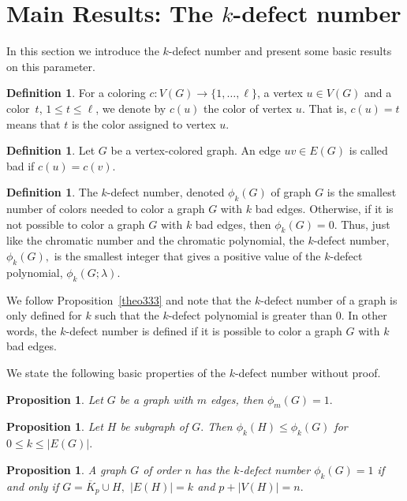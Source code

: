 \documentclass[12pt]{amsart}
\newtheorem{proposition}[theorem]{Proposition}
\theoremstyle{definition}
\newtheorem{definition}[theorem]{Definition}
\theoremstyle{remark}
\numberwithin{equation}{section}
\begin{document}
\section{Main Results: The $k$-defect number}\label{PrelResults}
In this section we introduce the $k$-defect number and present some basic results on this parameter.
\begin{definition}
For a coloring $c:V(G)\rightarrow \{1,\ldots,\ell\}$, a vertex $u \in V(G)$ and a color~$t$, $1\leq
t\leq \ell$, we denote by $c(u)$ the color of vertex $u$. That is, $c(u) = t$ means that $t$ is the color assigned to vertex $u$.
\end{definition}

\begin{definition}
Let $G$ be a  vertex-colored graph. An edge $uv \in E(G)$ is called bad if $c(u) = c(v)$.  
\end{definition}

\begin{definition}
The $k$-defect number, denoted $\phi_k(G)$ of graph $G$ is the smallest number of colors needed to color a graph $G$ with $k$ bad edges. Otherwise, if it is not possible  to color a graph $G$  with $k$ bad edges, then $\phi_k(G)=0.$  Thus, just like the chromatic number and the chromatic polynomial, the $k$-defect number, $\phi_k(G),$ is the smallest integer that gives  a positive value of  the $k$-defect polynomial, $\phi_{k}(G;\lambda).$ 
\end{definition}

We follow Proposition~\ref{theo333}  and  note that the $k$-defect number of a graph  is only defined  for $k$  such that  the $k$-defect polynomial is  greater than 0. In other words, the $k$-defect number is defined if it is possible to color a graph $G$  with $k$ bad edges.


 We state the following  basic properties of the $k$-defect number without proof.
\begin{proposition} Let $G$ be a graph with $m$ edges, then $\phi_m(G)=1.$ 
\end{proposition}
\begin{proposition} Let $H$ be subgraph of $G.$  Then $\phi_k(H)\leq \phi_k(G)$  for  $0\leq k\leq |E(G)|.$
\end{proposition}
\begin{proposition}\label{ChroG}
A graph $G$ of order $n$ has the $k$-defect number $\phi_k(G)=1$ if and only if $G= \overline{K}_{p} \cup H,$ $|E(H)|=k$  and $p+|V(H)|= n.$
\end{proposition}
\end{document}

